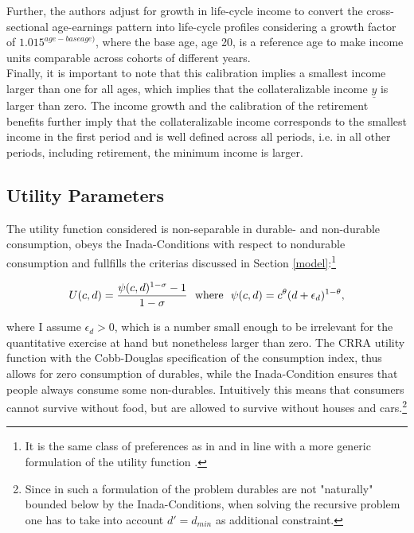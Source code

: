 \documentclass[a4paper,12pt,legno]{article}
\begin{document}
Further, the authors adjust for growth in life-cycle income to convert the cross-sectional age-earnings pattern into life-cycle profiles considering a growth factor of $1.015^{age-base age)}$, where the base age, age 20, is a reference age to make income units comparable across cohorts of different years.\\
Finally, it is important to note that this calibration implies a smallest income larger than one for all ages, which implies that the collateralizable income $\underline{y}$ is larger than zero. The income growth and the calibration of the retirement benefits further imply that the collateralizable income corresponds to the smallest income in the first period and is well defined across all periods, i.e. in all other periods, including retirement, the minimum income is larger. 

\subsection{Utility Parameters}

The utility function considered is non-separable in durable- and non-durable consumption, obeys the Inada-Conditions with respect to nondurable consumption and fullfills the criterias discussed in Section \ref{model}:\footnote{It is the same class of preferences as in \cite{hintermaier2010} and in line with a more generic formulation of the utility function \citep{FV&K2011}.}

\begin{equation}
U(c,d)=\frac{\psi(c,d)^{1-\sigma}-1}{1-\sigma} \ \ \textnormal{where} \ \ \psi(c,d)=c^{\theta}(d+\epsilon_{d})^{1-\theta},
\end{equation}

where I assume $\epsilon_{d} > 0$, which is a number small enough to be irrelevant for the quantitative exercise at hand but nonetheless larger than zero. The CRRA utility function with the Cobb-Douglas specification of the consumption index, thus allows for zero consumption of durables, while the Inada-Condition ensures that people always consume some non-durables. Intuitively this means that consumers cannot survive without food, but are allowed to survive without houses and cars.\footnote{Since in such a formulation of the problem durables are not "naturally" bounded below by the Inada-Conditions, when solving the recursive problem one has to take into account $d' = d_{min}$ as additional constraint.}
\end{document}
